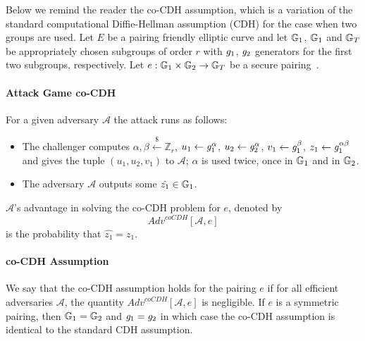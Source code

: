 \noindent Below we remind the reader the co-CDH assumption, which is a variation of the standard computational Diffie-Hellman assumption (CDH)
for the case when two groups are used. Let $E$ be a pairing friendly elliptic curve and 
let $\mathbb{G}_{1}$, $\mathbb{G}_{1}$ and $\mathbb{G}_{T}$ be appropriately chosen subgroups of order $r$ with  $\mathit{g}_{1}$, $\mathit{g}_{2}$ 
generators for the first two subgroups, respectively. Let $e: \mathbb{G}_{1} \times \mathbb{G}_{2} \rightarrow \mathbb{G}_{T}$ be a secure 
pairing~\cite{secure_pairings,pairings_for_cryptographers}. 
\paragraph{Attack Game co-CDH} For a given adversary $\mathcal{A}$ the attack runs as follows:
\begin{itemize}
\item The challenger computes $\alpha, \beta \xleftarrow{\$} \mathbb{Z}_r$, $u_1 \leftarrow \mathit{g}_{1}^{\alpha}$, $u_2 \leftarrow \mathit{g}_{2}^{\alpha}$,   
$v_1 \leftarrow \mathit{g}_{1}^{\beta}$, $z_1 \leftarrow \mathit{g}_{1}^{\alpha\beta}$ and gives the tuple $(u_1, u_2, v_1)$ to $\mathcal{A}$; $\alpha$ is used twice, 
once in $\mathbb{G}_{1}$ and in $\mathbb{G}_{2}$. 
\item The adversary $\mathcal{A}$ outputs some $\hat{z_1} \in \mathbb{G}_{1}$.
\end{itemize}
\noindent $\mathcal{A}$'s advantage in solving the co-CDH problem for $e$, denoted by $$\mathit{Adv}^{\mathit{coCDH}}[\mathcal{A},e]$$ is the probability 
that $\hat{z_1} = z_1$.
\paragraph{co-CDH Assumption} We say that the co-CDH assumption holds for the pairing $e$ if for all efficient adversaries $\mathcal{A}$, 
the quantity $\mathit{Adv}^{\mathit{coCDH}}[\mathcal{A},e]$ is negligible.
If $e$ is a symmetric pairing, then $\mathbb{G}_{1} = \mathbb{G}_{2}$ and $\mathit{g}_{1} = \mathit{g}_{2}$ in which case the co-CDH assumption is identical to the standard CDH assumption.